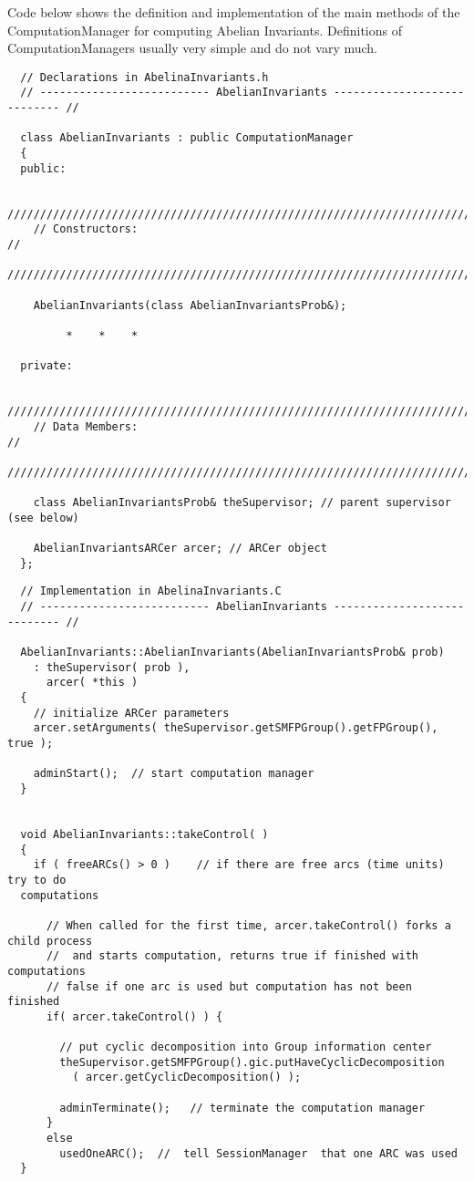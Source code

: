 \documentclass[12pt]{article}
\begin{document}
   
  Code below shows the definition and implementation of 
  the main methods of the ComputationManager for computing Abelian Invariants.
   Definitions of ComputationManagers usually very simple and do not vary much.

  \scriptsize
  \begin{verbatim}
  // Declarations in AbelinaInvariants.h
  // -------------------------- AbelianInvariants ---------------------------- //

  class AbelianInvariants : public ComputationManager
  {
  public:

    /////////////////////////////////////////////////////////////////////////
    // Constructors:                                                      //
    /////////////////////////////////////////////////////////////////////////

    AbelianInvariants(class AbelianInvariantsProb&);
   
         *    *    * 

  private:

    /////////////////////////////////////////////////////////////////////////
    // Data Members:                                                   //
    /////////////////////////////////////////////////////////////////////////

    class AbelianInvariantsProb& theSupervisor; // parent supervisor (see below)
    
    AbelianInvariantsARCer arcer; // ARCer object
  };
  \end{verbatim}
  \normalsize

  \scriptsize
  \begin{verbatim}
  // Implementation in AbelinaInvariants.C
  // -------------------------- AbelianInvariants ---------------------------- //

  AbelianInvariants::AbelianInvariants(AbelianInvariantsProb& prob)
    : theSupervisor( prob ),    
      arcer( *this )
  {
    // initialize ARCer parameters
    arcer.setArguments( theSupervisor.getSMFPGroup().getFPGroup(), true ); 

    adminStart();  // start computation manager
  }


  void AbelianInvariants::takeControl( )
  {
    if ( freeARCs() > 0 )    // if there are free arcs (time units) try to do 
  computations 

      // When called for the first time, arcer.takeControl() forks a child process
      //  and starts computation, returns true if finished with computations
      // false if one arc is used but computation has not been finished
      if( arcer.takeControl() ) { 
       
        // put cyclic decomposition into Group information center 
        theSupervisor.getSMFPGroup().gic.putHaveCyclicDecomposition    
          ( arcer.getCyclicDecomposition() );                          
        
        adminTerminate();   // terminate the computation manager 
      }
      else
        usedOneARC();  //  tell SessionManager  that one ARC was used
  }

  \end{verbatim}
  \normalsize
\end{document}
